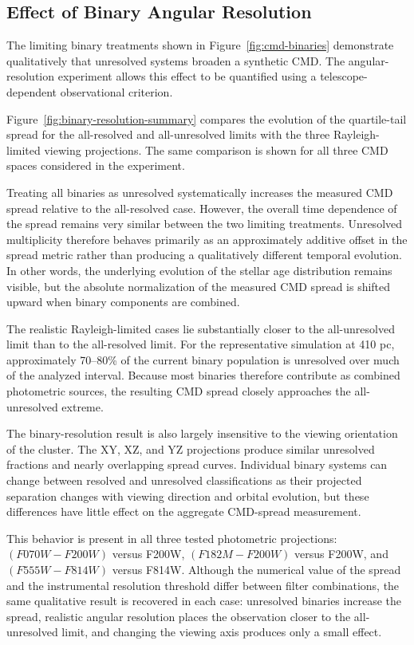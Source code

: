 \documentclass[linenumbers, twocolumn]{aastex631}
\begin{document}
\subsection{Effect of Binary Angular Resolution}
\label{sec:binary-resolution-results}
The limiting binary treatments shown in Figure~\ref{fig:cmd-binaries} demonstrate qualitatively that unresolved systems broaden a synthetic CMD. The angular-resolution experiment allows this effect to be quantified using a telescope-dependent observational criterion.

Figure~\ref{fig:binary-resolution-summary} compares the evolution of the quartile-tail spread for the all-resolved and all-unresolved limits with the three Rayleigh-limited viewing projections. The same comparison is shown for all three CMD spaces considered in the experiment.

Treating all binaries as unresolved systematically increases the measured CMD spread relative to the all-resolved case. However, the overall time dependence of the spread remains very similar between the two limiting treatments. Unresolved multiplicity therefore behaves primarily as an approximately additive offset in the spread metric rather than producing a qualitatively different temporal evolution. In other words, the underlying evolution of the stellar age distribution remains visible, but the absolute normalization of the measured CMD spread is shifted upward when binary components are combined.

The realistic Rayleigh-limited cases lie substantially closer to the all-unresolved limit than to the all-resolved limit. For the representative simulation at 410 pc, approximately 70--80\% of the current binary population is unresolved over much of the analyzed interval. Because most binaries therefore contribute as combined photometric sources, the resulting CMD spread closely approaches the all-unresolved extreme.

The binary-resolution result is also largely insensitive to the viewing orientation of the cluster. The XY, XZ, and YZ projections produce similar unresolved fractions and nearly overlapping spread curves. Individual binary systems can change between resolved and unresolved classifications as their projected separation changes with viewing direction and orbital evolution, but these differences have little effect on the aggregate CMD-spread measurement.

This behavior is present in all three tested photometric projections:
$(F070W-F200W)$ versus F200W,
$(F182M-F200W)$ versus F200W, and
$(F555W-F814W)$ versus F814W.
Although the numerical value of the spread and the instrumental resolution threshold differ between filter combinations, the same qualitative result is recovered in each case: unresolved binaries increase the spread, realistic angular resolution places the observation closer to the all-unresolved limit, and changing the viewing axis produces only a small effect.
\end{document}
